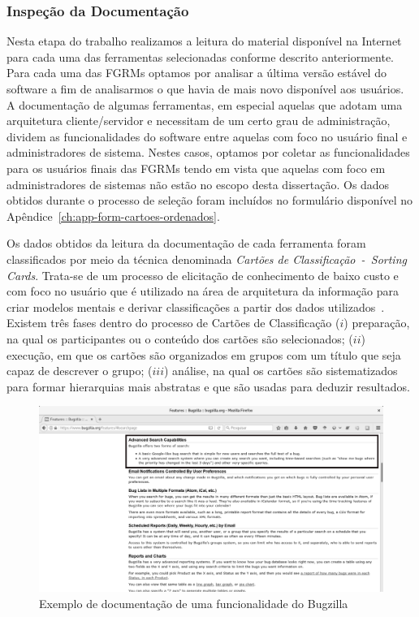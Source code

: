 \subsubsection{Inspeção da Documentação}\label{subsec:inspecao_doumentacao}

Nesta etapa do trabalho realizamos a leitura do material disponível na Internet
para cada uma das ferramentas selecionadas conforme descrito anteriormente.
Para cada uma das FGRMs optamos por analisar a última versão estável do
software a fim de analisarmos o que havia de mais novo disponível aos usuários.
A documentação de algumas ferramentas, em especial aquelas que adotam uma
arquitetura cliente/servidor e necessitam de um certo grau de administração,
dividem as funcionalidades do software entre aquelas com foco no usuário final
e ad\-mi\-nis\-tra\-do\-res de sistema. Nestes casos, optamos por coletar as
funcionalidades para os usuários finais das FGRMs tendo em vista que aquelas
com foco em administradores de sistemas não estão no escopo desta dissertação.
Os dados obtidos durante o processo de seleção foram incluídos no formulário
disponível no Apêndice~\ref{ch:app-form-cartoes-ordenados}.

Os dados obtidos da leitura da documentação de cada ferramenta foram
classificados por meio da técnica denominada \textit{Cartões de
    Classificação~-~Sorting Cards}. Trata-se de um processo de elicitação de
conhecimento de baixo custo e com foco no usuário que é utilizado na área de
arquitetura da informação para criar modelos mentais e derivar classificações a
partir dos dados utilizados~\cite{just2008towards}. Existem três fases dentro
do processo de Cartões de Classificação ($i$) preparação, na qual os
participantes ou o conteúdo dos cartões são selecionados; ($ii$) execução, em
que os cartões são organizados em grupos com um título que seja capaz de
descrever o grupo; ($iii$) análise, na qual os cartões são sistematizados para
formar hierarquias mais abstratas e que são usadas para deduzir resultados.

\begin{figure}[htpb]
	\centering
	\includegraphics[width=1.0\linewidth]{./chapter-estudo-funcionalidades-fgrm/img/documentacao_bugzilla.png}
	\caption{Exemplo de documentação de uma funcionalidade do Bugzilla}\label{fig:documentacao_bugzilla}
\end{figure}

